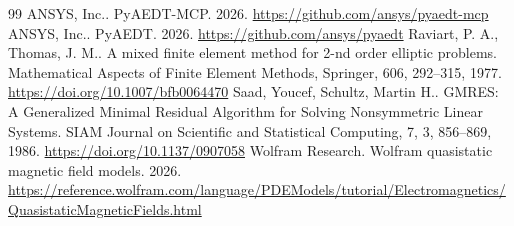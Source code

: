 \begin{thebibliography}{99}
 ANSYS, Inc.. PyAEDT-MCP. 2026. \url{https://github.com/ansys/pyaedt-mcp}
 ANSYS, Inc.. PyAEDT. 2026. \url{https://github.com/ansys/pyaedt}
 Raviart, P. A., Thomas, J. M.. A mixed finite element method for 2-nd order elliptic problems. Mathematical Aspects of Finite Element Methods, Springer, 606, 292--315, 1977. \url{https://doi.org/10.1007/bfb0064470}
 Saad, Youcef, Schultz, Martin H.. GMRES: A Generalized Minimal Residual Algorithm for Solving Nonsymmetric Linear Systems. SIAM Journal on Scientific and Statistical Computing, 7, 3, 856--869, 1986. \url{https://doi.org/10.1137/0907058}
 Wolfram Research. Wolfram quasistatic magnetic field models. 2026. \url{https://reference.wolfram.com/language/PDEModels/tutorial/Electromagnetics/QuasistaticMagneticFields.html}
\end{thebibliography}
